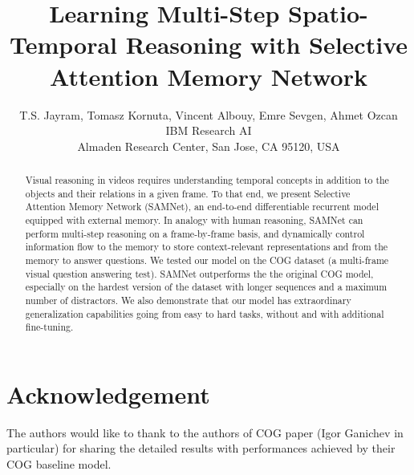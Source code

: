 \documentclass{article}
\title{Learning Multi-Step Spatio-Temporal Reasoning with Selective Attention Memory Network}
\author{T.S. Jayram, Tomasz Kornuta, Vincent Albouy, Emre Sevgen, Ahmet Ozcan\\
	IBM Research AI\\
	Almaden Research Center, San Jose, CA 95120, USA
}
\theoremstyle{remark}
\theoremstyle{definition}
\begin{document}
\maketitle
\begin{abstract}
Visual reasoning in videos requires understanding temporal concepts in addition to the objects and their relations in a given frame.  
To that end,
we present Selective Attention Memory Network (SAMNet), an end-to-end differentiable recurrent 
model equipped with external memory.  
In analogy with human reasoning, 
SAMNet can perform multi-step reasoning on a frame-by-frame basis, and dynamically control information flow to the memory 
to store context-relevant representations and from the memory to answer questions. 
We tested our model on the COG dataset (a multi-frame visual question answering test).
SAMNet outperforms the the original COG model, 
especially on the hardest version of the dataset with longer sequences and a maximum number of distractors.
We also demonstrate that our model has extraordinary generalization capabilities going from easy to hard tasks, without and with additional fine-tuning.
\end{abstract}









\section*{Acknowledgement}
The authors would like to thank to the authors of COG paper (Igor Ganichev in particular) for sharing the detailed results with performances achieved by their COG baseline model.
	



\newpage

\end{document}
